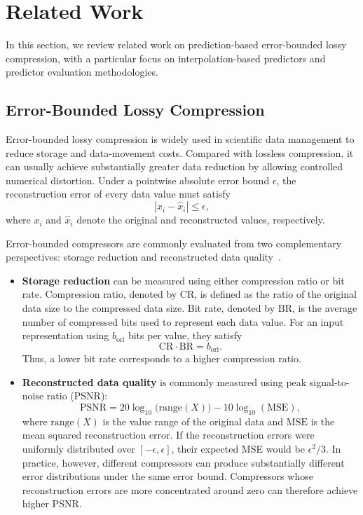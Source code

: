 \section{Related Work}\label{sec:related work}

In this section, we review related work on prediction-based error-bounded lossy compression, with a particular focus on interpolation-based predictors and predictor evaluation methodologies.

\subsection{Error-Bounded Lossy Compression}\label{sec:related work:compressors}

Error-bounded lossy compression is widely used in scientific data management to reduce storage and data-movement costs. Compared with lossless compression, it can usually achieve substantially greater data reduction by allowing controlled numerical distortion. Under a pointwise absolute error bound $\epsilon$, the reconstruction error of every data value must satisfy
\begin{equation}
    |x_i-\hat{x}_i| \leq \epsilon,
\end{equation}
where $x_i$ and $\hat{x}_i$ denote the original and reconstructed values, respectively.

Error-bounded compressors are commonly evaluated from two complementary perspectives: storage reduction and reconstructed data quality~\cite{cappello2019use,di2025survey,cappello2025support}.
\begin{itemize}
    \item \textbf{Storage reduction} can be measured using either compression ratio or bit rate. Compression ratio, denoted by $\mathrm{CR}$, is defined as the ratio of the original data size to the compressed data size. Bit rate, denoted by $\mathrm{BR}$, is the average number of compressed bits used to represent each data value. For an input representation using $b_{\mathrm{ori}}$ bits per value, they satisfy
    \begin{equation}
        \mathrm{CR}\cdot \mathrm{BR}=b_{\mathrm{ori}}.
    \end{equation}
    Thus, a lower bit rate corresponds to a higher compression ratio.

    \item \textbf{Reconstructed data quality} is commonly measured using peak signal-to-noise ratio (PSNR):
    \begin{equation}
        \mathrm{PSNR}=20\log_{10}\bigl(\mathrm{range}(X)\bigr)-10\log_{10}(\mathrm{MSE}),
    \end{equation}
    where $\mathrm{range}(X)$ is the value range of the original data and $\mathrm{MSE}$ is the mean squared reconstruction error. If the reconstruction errors were uniformly distributed over $[-\epsilon,\epsilon]$, their expected MSE would be $\epsilon^2/3$. In practice, however, different compressors can produce substantially different error distributions under the same error bound. Compressors whose reconstruction errors are more concentrated around zero can therefore achieve higher PSNR.
\end{itemize}

